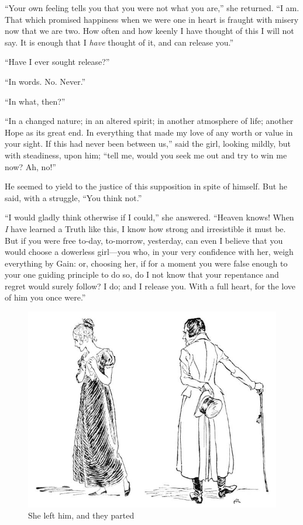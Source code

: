 \documentclass[paper=5.5in:8.5in,BCOR=15mm,twoside,DIV=15,headinclude=off,12pt,chapterprefix=off,openany,headings=huge]{scrbook} %
\begin{document}
\enquote{Your own feeling tells you that you were not what you are,} she returned. \enquote{I am. That which promised happiness when we were one in heart is fraught with misery now that we are two. How often and how keenly I have thought of this I will not say. It is enough that I \textit{have} thought of it, and can release you.}

\enquote{Have I ever sought release?}

\enquote{In words. No. Never.}

\enquote{In what, then?}

\enquote{In a changed nature; in an altered spirit; in another atmosphere of life; another Hope as its great end. In everything that made my love of any worth or value in your sight. If this had never been between us,} said the girl, looking mildly, but with steadiness, upon him; \enquote{tell me, would you seek me out and try to win me now? Ah, no!}

He seemed to yield to the justice of this supposition in spite of himself. But he said, with a struggle, \enquote{You think not.}

\enquote{I would gladly think otherwise if I could,} she answered. \enquote{Heaven knows! When \textit{I} have learned a Truth like this, I know how strong and irresistible it must be. But if you were free to-day, to-morrow, yesterday, can even I believe that you would choose a dowerless girl—you who, in your very confidence with her, weigh everything by Gain: or, choosing her, if for a moment you were false enough to your one guiding principle to do so, do I not know that your repentance and regret would surely follow? I do; and I release you. With a full heart, for the love of him you once were.}

\begin{figure}
\begin{minipage}[c]{\linewidth}
\includegraphics[width=\linewidth]{gs081}
\caption*{She left him, and they parted}
\end{minipage}
\end{figure}
\end{document}
